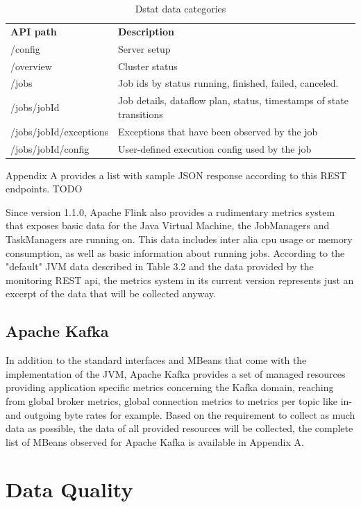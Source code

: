 \begin{table}[H]
    \begin{tabular}{ll}
        \textbf{API path} & \textbf{Description} \\
        /config & Server setup \\
        /overview & Cluster status \\
        /jobs & Job ids by status running, finished, failed, canceled. \\
        /jobs/{jobId} & Job details, dataflow plan, status, timestamps of state transitions \\
        /jobs/{jobId}/exceptions &  Exceptions that have been observed by the job \\
        /jobs/{jobId}/config & User-defined execution config used by the job \\
    \end{tabular}
    \caption{Dstat data categories}
    \label{tbl:dstatcategories}
\end{table}

Appendix A provides a list with sample JSON response according to this REST endpoints. TODO

Since version 1.1.0, Apache Flink also provides a rudimentary metrics system that exposes
basic data for the Java Virtual Machine, the JobManagers and TaskManagers are running
on. This data includes inter alia cpu usage or memory consumption, as well as basic
information about running jobs. According to the "default" JVM data described in Table 3.2
and the data provided by the monitoring REST api, the metrics system in its current version
represents just an excerpt of the data that will be collected anyway.

\subsection{Apache Kafka}

In addition to the standard interfaces and MBeans that come with the implementation
of the JVM, Apache Kafka provides a set of managed resources providing application
specific metrics concerning the Kafka domain, reaching from global broker metrics, global
connection metrics to metrics per topic like in- and outgoing byte rates for example. Based
on the requirement to collect as much data as possible, the data of all provided resources
will be collected, the complete list of MBeans observed for Apache Kafka is available in
Appendix A.

\section{Data Quality}

